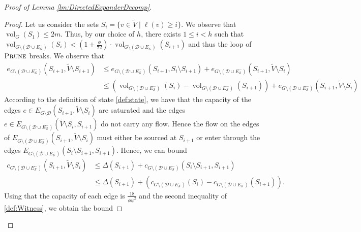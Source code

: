 \documentclass[11pt]{article}
\newcommand\bell{\boldsymbol{\mathit{\ell}}}
\newcommand\cc{\boldsymbol{\mathit{c}}}
\begin{document}
\begin{proof}[Proof of Lemma \ref{lm:DirectedExpanderDecomp}]
\begin{proof}
Let us consider the sets $S_i = \{v \in \tilde{V} \mid \bell(v) \geq i\}.$ We observe that $\operatorname{vol}_G(S_1) \leq 2m$. Thus, by our choice of $h$, there exists $1 \leq i < h$ such that $\operatorname{vol}_{G \setminus \left(\mathcal{D} \cup E^-_{\mathcal{S}}\right)}(S_{i}) < (1 + \frac{\phi}{72}) \cdot \operatorname{vol}_{G \setminus \left(\mathcal{D} \cup E^-_{\mathcal{S}}\right)}(S_{i+1})$ and thus the loop of $\textsc{Prune}$ breaks. We observe that
\begin{align*}
    e_{G \setminus \left(\mathcal{D} \cup E^-_{\mathcal{S}}\right)}(S_{i+1}, \tilde{V} \setminus S_{i+1}) &\leq e_{G \setminus \left(\mathcal{D} \cup E^-_{\mathcal{S}}\right)}(S_{i+1}, S_{i} \setminus S_{i+1}) + e_{G \setminus \left(\mathcal{D} \cup E^-_{\mathcal{S}}\right)}(S_{i+1}, \tilde{V} \setminus S_{i}) \\
    &\leq \left( \operatorname{vol}_{G \setminus \left(\mathcal{D} \cup E^-_{\mathcal{S}}\right)}(S_{i}) - \operatorname{vol}_{G \setminus \left(\mathcal{D} \cup E^-_{\mathcal{S}}\right)}(S_{i+1}) \right) + e_{G \setminus \left(\mathcal{D} \cup E^-_{\mathcal{S}}\right)}(S_{i+1}, \tilde{V} \setminus S_{i})
\end{align*}
According to the definition of state \eqref{def:state}, we have that the capacity of the edges $e \in E_{G \setminus \mathcal{D}}(S_{i+1}, \tilde{V} \setminus S_i)$ are saturated and the edges $e \in E_{G \setminus \left(\mathcal{D} \cup E^-_{\mathcal{S}}\right)}(\tilde{V} \setminus S_i, S_{i+1})$ do not carry any flow. Hence the flow on the edges of $E_{G \setminus \left(\mathcal{D} \cup E^-_{\mathcal{S}}\right)}(S_{i+1}, \tilde{V} \setminus S_i)$ must either be sourced at $S_{i+1}$ or enter through the edges $E_{G \setminus \left(\mathcal{D} \cup E^-_{\mathcal{S}}\right)}(S_i \setminus S_{i+1}, S_{i+1})$. Hence, we can bound 
\begin{align*}
    \cc_{G \setminus \left(\mathcal{D} \cup E^-_{\mathcal{S}}\right)}(S_{i+1}, \tilde{V} \setminus S_{i}) &\leq \Delta(S_{i+1}) + \cc_{G \setminus \left(\mathcal{D} \cup E^-_{\mathcal{S}}\right)}(S_{i} \setminus S_{i+1}, S_{i+1}) \\
    &\leq \Delta(S_{i+1}) + \left(\cc_{G \setminus \left(\mathcal{D} \cup E^-_{\mathcal{S}}\right)}(S_{i}) - \cc_{G \setminus \left(\mathcal{D} \cup E^-_{\mathcal{S}}\right)}(S_{i+1})\right).
\end{align*}
Using that the capacity of each edge is $\frac{18}{\phi \psi^2}$ and the second inequality of \eqref{def:Witness}, we obtain the bound

\end{proof}
\end{proof}
\end{document}
